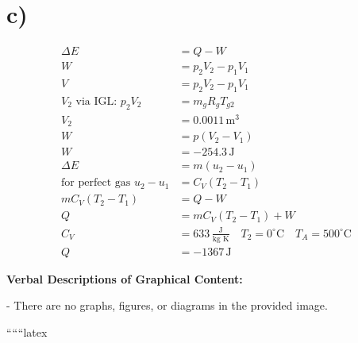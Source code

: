 

\section*{c)}

\begin{align*}
\Delta E &= Q - W \\
W &= p_2 V_2 - p_1 V_1 \\
V &= p_2 V_2 - p_1 V_1 \\
V_2 \text{ via IGL: } p_2 V_2 &= m_g R_{g} T_{g2} \\
V_2 &= 0.0011 \, \text{m}^3 \\
W &= p (V_2 - V_1) \\
W &= -254.3 \, \text{J} \\
\Delta E &= m (u_2 - u_1) \\
\text{for perfect gas } u_2 - u_1 &= C_V (T_2 - T_1) \\
m C_V (T_2 - T_1) &= Q - W \\
Q &= m C_V (T_2 - T_1) + W \\
C_V &= 633 \, \frac{\text{J}}{\text{kg K}} \quad T_2 = 0^\circ \text{C} \quad T_A = 500^\circ \text{C} \\
Q &= -1367 \, \text{J}
\end{align*}

\textbf{Verbal Descriptions of Graphical Content:}

- There are no graphs, figures, or diagrams in the provided image.

``````latex